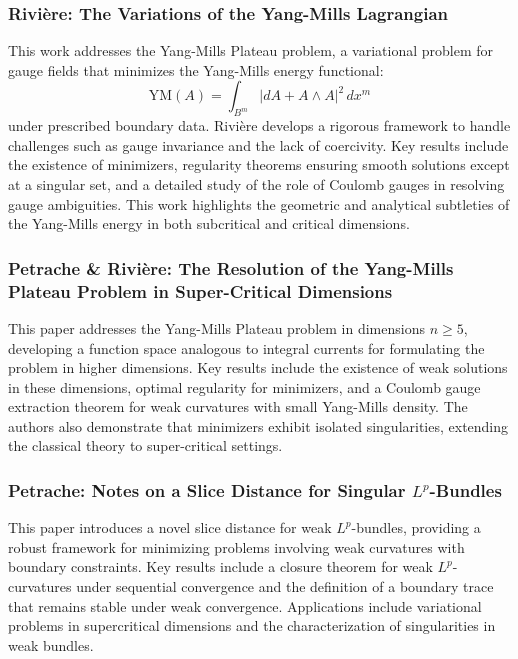 \documentclass[10pt, letterpaper]{article}
\theoremstyle{custom}
\theoremstyle{definition}
\begin{document}
\subsubsection{Rivière: The Variations of the Yang-Mills Lagrangian \cite{riviere2015yangmills}} 
This work addresses the Yang-Mills Plateau problem, a variational problem for gauge fields that minimizes the Yang-Mills energy functional:
$$
\text{YM}(A) = \int_{B^m} |dA + A \wedge A|^2 \, dx^m
$$
under prescribed boundary data. Rivière develops a rigorous framework to handle challenges such as gauge invariance and the lack of coercivity. Key results include the existence of minimizers, regularity theorems ensuring smooth solutions except at a singular set, and a detailed study of the role of Coulomb gauges in resolving gauge ambiguities. This work highlights the geometric and analytical subtleties of the Yang-Mills energy in both subcritical and critical dimensions.


\subsubsection{Petrache \& Rivière: The Resolution of the Yang-Mills Plateau Problem in Super-Critical Dimensions \cite{petrache2016yangmills}} 
This paper addresses the Yang-Mills Plateau problem in dimensions \(n \geq 5\), developing a function space analogous to integral currents for formulating the problem in higher dimensions. Key results include the existence of weak solutions in these dimensions, optimal regularity for minimizers, and a Coulomb gauge extraction theorem for weak curvatures with small Yang-Mills density. The authors also demonstrate that minimizers exhibit isolated singularities, extending the classical theory to super-critical settings.


\subsubsection{Petrache: Notes on a Slice Distance for Singular \(L^p\)-Bundles \cite{petrache2014slicedistance}} 
This paper introduces a novel slice distance for weak \(L^p\)-bundles, providing a robust framework for minimizing problems involving weak curvatures with boundary constraints. Key results include a closure theorem for weak \(L^p\)-curvatures under sequential convergence and the definition of a boundary trace that remains stable under weak convergence. Applications include variational problems in supercritical dimensions and the characterization of singularities in weak bundles.
\end{document}
